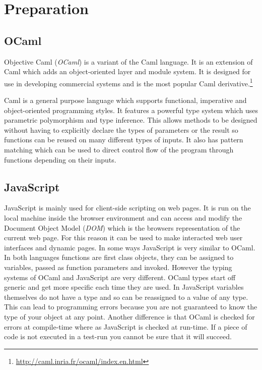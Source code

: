 \chapter{Preparation}

\section{OCaml}
Objective Caml (\emph{OCaml}) is a variant of the Caml language. It is an extension of Caml which adds an object-oriented layer and module system. It is designed for use in developing commercial systems and is the most popular Caml derivative.\footnote{\url{http://caml.inria.fr/ocaml/index.en.html}}

Caml is a general purpose language which supports functional, imperative and object-oriented programming styles. It features a powerful type system which uses parametric polymorphism and type inference. This allows methods to be designed without having to explicitly declare the types of parameters or the result so functions can be reused on many different types of inputs. It also has pattern matching which can be used to direct control flow of the program through functions depending on their inputs.

\section{JavaScript}
JavaScript is mainly used for client-side scripting on web pages. It is run on the local machine inside the browser environment and can access and modify the Document Object Model (\emph{DOM}) which is the browsers representation of the current web page. For this reason it can be used to make interacted web user interfaces and dynamic pages. In some ways JavaScript is very similar to OCaml. In both languages functions are first class objects, they can be assigned to variables, passed as function parameters and invoked. However the typing systems of OCaml and JavaScript are very different. OCaml types start off generic and get more specific each time they are used. In JavaScript variables themselves do not have a type and so can be reassigned to a value of any type. This can lead to programming errors because you are not guaranteed to know the type of your object at any point. Another difference is that OCaml is checked for errors at compile-time where as JavaScript is checked at run-time. If a piece of code is not executed in a test-run you cannot be sure that it will succeed.

